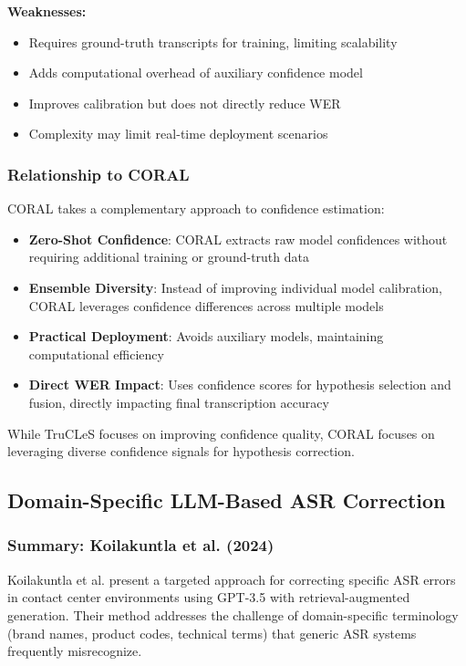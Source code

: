 \textbf{Weaknesses:}
\begin{itemize}[topsep=4pt,itemsep=2pt]
    \item Requires ground-truth transcripts for training, limiting scalability
    \item Adds computational overhead of auxiliary confidence model
    \item Improves calibration but does not directly reduce WER
    \item Complexity may limit real-time deployment scenarios
\end{itemize}

\subsubsection{Relationship to CORAL}

CORAL takes a complementary approach to confidence estimation:

\begin{itemize}[topsep=4pt,itemsep=2pt]
    \item \textbf{Zero-Shot Confidence}: CORAL extracts raw model confidences without requiring additional training or ground-truth data
    \item \textbf{Ensemble Diversity}: Instead of improving individual model calibration, CORAL leverages confidence differences across multiple models
    \item \textbf{Practical Deployment}: Avoids auxiliary models, maintaining computational efficiency
    \item \textbf{Direct WER Impact}: Uses confidence scores for hypothesis selection and fusion, directly impacting final transcription accuracy
\end{itemize}

While TruCLeS focuses on improving confidence quality, CORAL focuses on leveraging diverse confidence signals for hypothesis correction.

\subsection{Domain-Specific LLM-Based ASR Correction}

\subsubsection{Summary: Koilakuntla et al. (2024)}

Koilakuntla et al. \cite{koilakuntla2024} present a targeted approach for correcting specific ASR errors in contact center environments using GPT-3.5 with retrieval-augmented generation. Their method addresses the challenge of domain-specific terminology (brand names, product codes, technical terms) that generic ASR systems frequently misrecognize.

